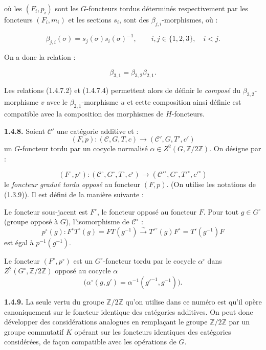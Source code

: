 %
où les $(F_i,p_i)$ sont les $G$-foncteurs tordus déterminés
respectivement par les foncteurs $(F_i,m_i)$ et les sections $s_i$,
sont des $\beta_{j,i}$-morphismes, où :

\begin{equation}
  \beta_{j,i}(\sigma)=s_j(\sigma)s_i(\sigma)^{-1},
  \qquad i,j\in\{1,2,3\},\quad i<j.
  \tag{1.4.7.3}
\end{equation}

On a donc la relation :

\begin{equation}
  \beta_{3,1}=\beta_{3,2}\beta_{2,1}.
  \tag{1.4.7.4}
\end{equation}

Les relations (1.4.7.2) et (1.4.7.4) permettent alors de définir le
\emph{composé} du $\beta_{3,2}$-morphisme $v$ avec le
$\beta_{2,1}$-morphisme $u$ et cette composition ainsi définie est
compatible avec la composition des morphismes de $H$-foncteurs.

\noindent\textbf{1.4.8.}\quad
Soient $\mathcal C'$ une catégorie additive et :
\[
  (F,p)\colon(\mathcal C,G,T,c)\longrightarrow
  (\mathcal C',G,T',c')
\]
un $G$-foncteur tordu par un cocycle normalisé
$\alpha\in Z^2(G,\mathbb Z/2\mathbb Z)$. On désigne par :

\begin{equation}
  (F^{\circ},p^{\circ})\colon
  (\mathcal C^{\circ},G^{\circ},T^{\circ},c^{\circ})
  \longrightarrow
  (\mathcal C'^{\circ},G^{\circ},T'^{\circ},c'^{\circ})
  \tag{1.4.8.1}
\end{equation}
le \emph{foncteur gradué tordu opposé} au foncteur $(F,p)$. (On
utilise les notations de (1.3.9)). Il est défini de la manière
suivante :

Le foncteur sous-jacent est $F^{\circ}$, le foncteur opposé au
foncteur $F$. Pour tout $g\in G^{\circ}$ (groupe opposé à $G$),
l'isomorphisme de $\mathcal C^{\circ}$ :
\[
  p^{\circ}(g)\colon
  F^{\circ}T^{\circ}(g)=FT(g^{-1})
  \overset{\sim}{\longrightarrow}
  T'^{\circ}(g)F^{\circ}=T'(g^{-1})F
\]
est égal à $p^{-1}(g^{-1})$.

Le foncteur $(F^{\circ},p^{\circ})$ est un $G^{\circ}$-foncteur tordu
par le cocycle $\alpha^{\circ}$ dans
$Z^2(G^{\circ},\mathbb Z/2\mathbb Z)$ opposé au cocycle $\alpha$
\[
  \bigl(\alpha^{\circ}(g,g')
  =\alpha^{-1}(g'^{-1},g^{-1})\bigr).
\]

\noindent\textbf{1.4.9.}\quad
La seule vertu du groupe $\mathbb Z/2\mathbb Z$ qu'on utilise dans ce
numéro est qu'il opère canoniquement sur le foncteur identique des
catégories additives. On peut donc développer des considérations
analogues en remplaçant le groupe $\mathbb Z/2\mathbb Z$ par un groupe
commutatif $K$ opérant sur les foncteurs identiques des catégories
considérées, de façon compatible avec les opérations de $G$.
